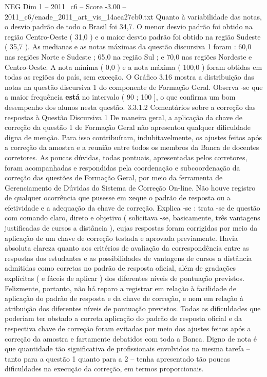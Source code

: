 \begin{textsample}{NEG Dim 1 – 2011\_c6 – Score -3.00 – 2011\_c6/enade\_2011\_art\_vis\_14aea27cb0.txt}
Quanto à variabilidade das notas, o desvio padrão de todo o Brasil foi 34,7.
O menor desvio padrão foi obtido na região Centro-Oeste ( 31,0 ) e o maior desvio padrão foi obtido na região Sudeste ( 35,7 ).
As medianas e as notas máximas da questão discursiva 1 foram : 60,0 nas regiões Norte e Sudeste ; 65,0 na região Sul ; e 70,0 nas regiões Nordeste e Centro-Oeste.
A nota mínima ( 0,0 ) e a nota máxima ( 100,0 ) foram obtidas em todas as regiões do país, sem exceção.
O Gráfico 3.16 mostra a distribuição das notas na questão discursiva 1 do componente de Formação Geral.
Observa -se que a maior frequência \textbf{está} no intervalo ( 90 ; 100 ], o que confirma um bom desempenho dos alunos nesta questão. 3.3.1.2 Comentários sobre a correção das respostas à Questão Discursiva 1 De maneira geral, a aplicação da chave de correção da questão 1 de Formação Geral não apresentou qualquer dificuldade digna de menção.
Para isso contribuíram, indubitavelmente, os ajustes feitos após a correção da amostra e a reunião entre todos os membros da Banca de docentes corretores.
As poucas dúvidas, todas pontuais, apresentadas pelos corretores, foram acompanhadas e respondidas pela coordenação e subcoordenação da correção das questões de Formação Geral, por meio da ferramenta de Gerenciamento de Dúvidas do Sistema de Correção On-line.
Não houve registro de qualquer ocorrência que pusesse em xeque o padrão de resposta ou a efetividade e a adequação da chave de correção.
Explica -se : trata -se de questão com comando claro, direto e objetivo ( solicitava -se, basicamente, três vantagens justificadas de cursos a distância ), cujas respostas foram corrigidas por meio da aplicação de um chave de correção testada e aprovada previamente.
Havia absoluta clareza quanto aos critérios de avaliação da correspondência entre as respostas dos estudantes e as possibilidades de vantagens de cursos a distância admitidas como corretas no padrão de resposta oficial, além de gradações explícitas ( e fáceis de aplicar ) dos diferentes níveis de pontuação previstos.
Felizmente, portanto, não há reparo a registrar em relação à facilidade de aplicação do padrão de resposta e da chave de correção, e nem em relação à atribuição dos diferentes níveis de pontuação previstos.
Todas as dificuldades que poderiam ter obstado a correta aplicação do padrão de resposta oficial e da respectiva chave de correção foram evitadas por meio dos ajustes feitos após a correção da amostra e fartamente debatidos com toda a Banca.
Digno de nota é que quantidade tão significativa de profissionais envolvidos na mesma tarefa – tanto para a questão 1 quanto para a 2 – tenha apresentado tão poucas dificuldades na execução da correção, em termos proporcionais.

\end{textsample}
